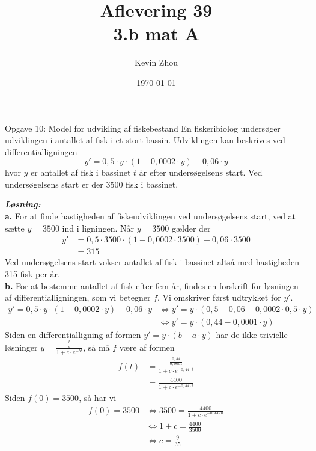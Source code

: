 \documentclass{article}
\title{Aflevering 39\\
{\Large \textbf{3.b mat A}}}
\author{Kevin Zhou}
\date{\today}
\newcommand{\sol}{\setlength{\parindent}{0cm}\textbf{\textit{Løsning:}}\setlength{\parindent}{1cm}}
\begin{document}
\maketitle
\newpage
\begin{question}{Opgave 10: Model for udvikling af fiskebestand}{}
  En fiskeribiolog undersøger udviklingen i antallet af fisk i et stort bassin.
Udviklingen kan beskrives ved differentialligningen
\[
  y'=0,5 \cdot y \cdot \left(1-0,0002 \cdot y\right) -0,06 \cdot y
\] 
hvor $y$ er antallet af fisk i bassinet $t$ år efter undersøgelsens start.
Ved undersøgelsens start er der 3500 fisk i bassinet. 
\end{question}
\sol \\
\textbf{a.}
For at finde hastigheden af fiskeudviklingen ved undersøgelsens start, ved at sætte $y=3500$ ind i ligningen. 
Når $y=3500$ gælder der 
\begin{equation*}
\begin{split}
  y'&=0,5 \cdot 3500 \cdot \left(1-0,0002 \cdot 3500\right) -0,06 \cdot 3500\\
  &=315
\end{split}
\end{equation*}
Ved undersøgelsens start vokser antallet af fisk i bassinet altså med hastigheden 315 fisk per år.\\[1ex]
\textbf{b.}
For at bestemme antallet af fisk efter fem år, findes en forskrift for løsningen af differentialligningen, som vi betegner $f$.
Vi omskriver først udtrykket for $y'$.
\begin{equation*}
\begin{split}
  y'=0,5 \cdot y \cdot \left(1-0,0002 \cdot y\right) -0,06 \cdot y &\iff y'=y \cdot \left(0,5 - 0,06 - 0,0002 \cdot 0,5 \cdot y\right) \\
  &\iff y'=y \cdot \left(0,44-0,0001 \cdot y\right) 
\end{split}
\end{equation*}
Siden en differentialligning af formen $y'=y \cdot \left(b-a \cdot y\right) $ har de ikke-trivielle løsninger $y=\frac{\frac{b}{a}}{1+c \cdot e^{-bt} }$, så må $f$ være af formen 
\begin{equation*}
\begin{split}
f(t)&=\frac{\frac{0,44}{0,0001}}{1+ c \cdot e^{-0,44 \cdot t} }\\
&=\frac{4400}{1+c \cdot e^{-0,44 \cdot t} }
\end{split}
\end{equation*}
Siden $f(0)=3500$, så har vi 
\begin{equation*}
\begin{split}
  f(0)= 3500 &\iff 3500 = \frac{4400}{1+c \cdot e^{-0,44 \cdot 0} }\\
  &\iff 1+c=\frac{4400}{3500}\\
  &\iff c=\frac{9}{35}
\end{split}
\end{equation*}
\end{document}
